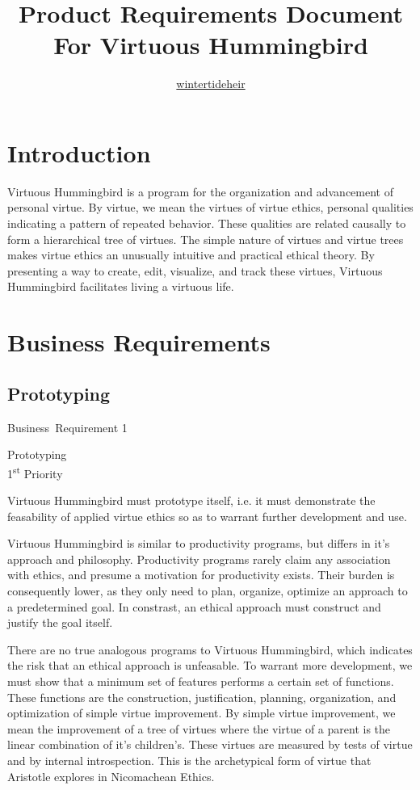 \documentclass{article}
\title{Product Requirements Document \\ \vspace{1mm} \normalsize For Virtuous Hummingbird}
\author{\href{https://github.com/wintertideheir}{wintertideheir}}
\date{}
\newcommand{\requirementname}{Undefined}
\newcommand{\requirementlabel}{undefined}
\newcommand{\setreqtype}[2]
    {
        \renewcommand{\requirementname}{#1}
        \renewcommand{\requirementlabel}{#2}
    }
\newenvironment{requirement}[2][]
    {
        \begin{mdframed}
        \label{\requirementlabel-#2}
        \vspace{2.5mm}
        \begin{center}
            {
                \large
                \requirementname\ Requirement #2
            
                #1
            }
        \end{center}
        \vspace{2.5mm}
    }
    {
        \end{mdframed}
    }
\begin{document}
\maketitle
\tableofcontents

\section{Introduction}

Virtuous Hummingbird is a program for the organization and advancement of personal virtue.
By virtue, we mean the virtues of virtue ethics, personal qualities indicating a pattern of repeated behavior.
These qualities are related causally to form a hierarchical tree of virtues. 
The simple nature of virtues and virtue trees makes virtue ethics an unusually intuitive and practical ethical theory.
By presenting a way to create, edit, visualize, and track these virtues, Virtuous Hummingbird facilitates living a virtuous life.

\section{Business Requirements}
\setreqtype{Business}{business}

\subsection{Prototyping}

\begin{requirement}[Prototyping \\ 1\textsuperscript{st} Priority]{1}
    Virtuous Hummingbird must prototype itself, i.e. it must demonstrate the feasability of applied virtue ethics so as to warrant further development and use.
\end{requirement}

Virtuous Hummingbird is similar to productivity programs, but differs in it's approach and philosophy.
Productivity programs rarely claim any association with ethics, and presume a motivation for productivity exists.
Their burden is consequently lower, as they only need to plan, organize, optimize an approach to a predetermined goal.
In constrast, an ethical approach must construct and justify the goal itself.

There are no true analogous programs to Virtuous Hummingbird, which indicates the risk that an ethical approach is unfeasable.
To warrant more development, we must show that a minimum set of features performs a certain set of functions.
These functions are the construction, justification, planning, organization, and optimization of simple virtue improvement.
By simple virtue improvement, we mean the improvement of a tree of virtues where the virtue of a parent is the linear combination of it's children's.
These virtues are measured by tests of virtue and by internal introspection.
This is the archetypical form of virtue that Aristotle explores in Nicomachean Ethics.
\end{document}
